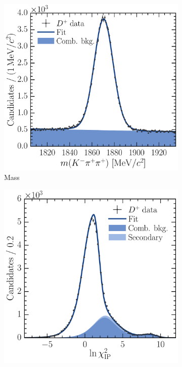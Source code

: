 \begin{figure}
\begin{subfigure}[b]{0.5\textwidth}
    \caption{\lnipchisq}
    \label{fig:prod:fitting:DpToKpipi:ipchisq_high_sig}
  \end{subfigure}
  \begin{subfigure}[b]{0.5\textwidth}
    \centering
    \includegraphics[width=\textwidth]{figures/production/fitting/DpToKpipi_mass_fit_pT_3_y_3}
    \caption{Mass}
    \label{fig:prod:fitting:DpToKpipi:mass_high_bkg}
  \end{subfigure}
  \begin{subfigure}[b]{0.5\textwidth}
    \centering
    \includegraphics[width=\textwidth]{figures/production/fitting/DpToKpipi_ipchisq_fit_pT_3_y_3}

\end{subfigure}
\end{figure}
